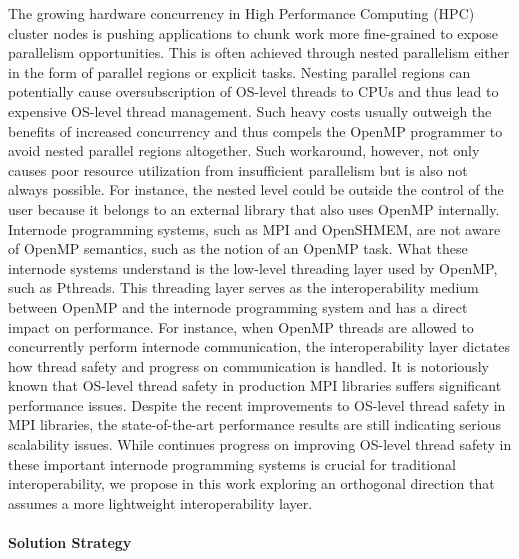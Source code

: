 The growing hardware concurrency in High Performance Computing (HPC)
cluster nodes is pushing applications to chunk work more fine-grained
to expose parallelism opportunities.  This is often achieved through
nested parallelism either in the form of parallel regions or explicit
tasks.  Nesting parallel regions can potentially cause
oversubscription of OS-level threads to CPUs and thus lead to
expensive OS-level thread management.  Such heavy costs usually
outweigh the benefits of increased concurrency and thus compels the
OpenMP programmer to avoid nested parallel regions altogether.  Such
workaround, however, not only causes poor resource utilization from
insufficient parallelism but is also not always possible.  For
instance, the nested level could be outside the control of the user
because it belongs to an external library that also uses OpenMP
internally.  Internode programming systems, such as MPI and OpenSHMEM,
are not aware of OpenMP semantics, such as the notion of an OpenMP
task.  What these internode systems understand is the low-level
threading layer used by OpenMP, such as Pthreads.  This threading
layer serves as the interoperability medium between OpenMP and the
internode programming system and has a direct impact on performance.
For instance, when OpenMP threads are allowed to concurrently perform
internode communication, the interoperability layer dictates how
thread safety and progress on communication is handled.  It is
notoriously known that OS-level thread safety in production MPI
libraries suffers significant performance issues.  Despite the recent
improvements to OS-level thread safety in MPI libraries, the
state-of-the-art performance results are still indicating serious
scalability issues.  While continues progress on improving OS-level
thread safety in these important internode programming systems is
crucial for traditional interoperability, we propose in this work
exploring an orthogonal direction that assumes a more lightweight
interoperability layer.

\paragraph{Solution Strategy}

